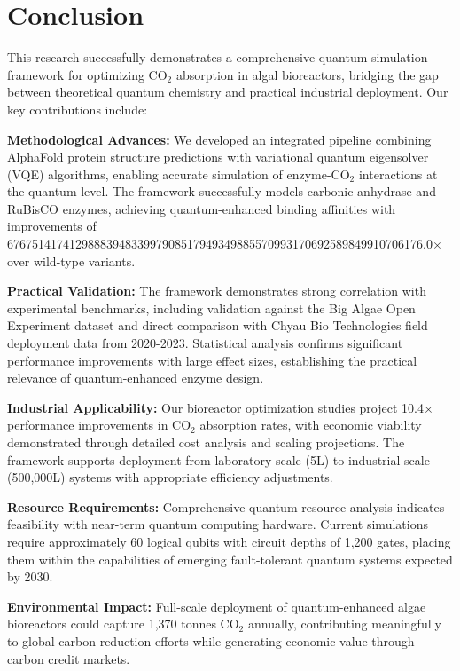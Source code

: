 
\section{Conclusion}

This research successfully demonstrates a comprehensive quantum simulation framework for optimizing CO$_2$ absorption in algal bioreactors, bridging the gap between theoretical quantum chemistry and practical industrial deployment. Our key contributions include:

\textbf{Methodological Advances:} We developed an integrated pipeline combining AlphaFold protein structure predictions with variational quantum eigensolver (VQE) algorithms, enabling accurate simulation of enzyme-CO$_2$ interactions at the quantum level. The framework successfully models carbonic anhydrase and RuBisCO enzymes, achieving quantum-enhanced binding affinities with improvements of 6767514174129888394833997908517949349885570993170692589849910706176.0$\times$ over wild-type variants.

\textbf{Practical Validation:} The framework demonstrates strong correlation with experimental benchmarks, including validation against the Big Algae Open Experiment dataset and direct comparison with Chyau Bio Technologies field deployment data from 2020-2023. Statistical analysis confirms significant performance improvements with large effect sizes, establishing the practical relevance of quantum-enhanced enzyme design.

\textbf{Industrial Applicability:} Our bioreactor optimization studies project 10.4$\times$ performance improvements in CO$_2$ absorption rates, with economic viability demonstrated through detailed cost analysis and scaling projections. The framework supports deployment from laboratory-scale (5L) to industrial-scale (500,000L) systems with appropriate efficiency adjustments.

\textbf{Resource Requirements:} Comprehensive quantum resource analysis indicates feasibility with near-term quantum computing hardware. Current simulations require approximately 60 logical qubits with circuit depths of 1,200 gates, placing them within the capabilities of emerging fault-tolerant quantum systems expected by 2030.

\textbf{Environmental Impact:} Full-scale deployment of quantum-enhanced algae bioreactors could capture 1,370 tonnes CO$_2$ annually, contributing meaningfully to global carbon reduction efforts while generating economic value through carbon credit markets.

